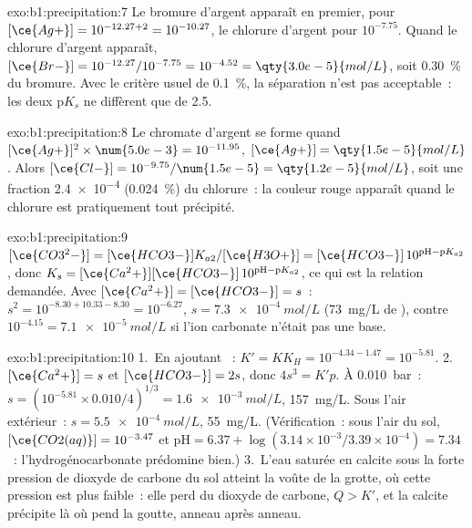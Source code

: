 \begin{solution}{exo:b1:precipitation:7}
Le bromure d'argent apparaît en premier, pour $[\ce{Ag+}] = 10^{-12.27 + 2} =
10^{-10.27}$, le chlorure d'argent pour $10^{-7.75}$. Quand le chlorure
d'argent apparaît, $[\ce{Br-}] = 10^{-12.27}/10^{-7.75} = 10^{-4.52} =
\qty{3.0e-5}{mol/L}$, soit \qty{0.30}{\percent} du bromure. Avec le
critère usuel de \qty{0.1}{\percent}, la séparation n'est pas
acceptable~: les deux
$\mathrm{p}K_s$ ne diffèrent que de 2.5.
\end{solution}

\begin{solution}{exo:b1:precipitation:8}
Le chromate d'argent se forme quand $[\ce{Ag+}]^2 \times \num{5.0e-3} = 10^{-11.95}$,
$[\ce{Ag+}] = \qty{1.5e-5}{mol/L}$. Alors $[\ce{Cl-}] = 10^{-9.75}/\num{1.5e-5}
= \qty{1.2e-5}{mol/L}$, soit une fraction \num{2.4e-4}
(\qty{0.024}{\percent}) du chlorure~: la couleur rouge apparaît quand le
chlorure est pratiquement tout précipité.
\end{solution}

\begin{solution}{exo:b1:precipitation:9}
$[\ce{CO3^2-}] = [\ce{HCO3-}]K_{a2}/[\ce{H3O+}] = [\ce{HCO3-}]\,10^{\mathrm{pH}
- \mathrm{p}K_{a2}}$, donc $K_s = [\ce{Ca^2+}][\ce{HCO3-}]\,10^{\mathrm{pH} -
\mathrm{p}K_{a2}}$, ce qui est la relation demandée. Avec $[\ce{Ca^2+}] =
[\ce{HCO3-}] = s$~: $s^2 = 10^{-8.30 + 10.33 - 8.30} = 10^{-6.27}$,
$s = \qty{7.3e-4}{mol/L}$ (\qty{73}{mg/L} de ), contre
$10^{-4.15} = \qty{7.1e-5}{mol/L}$ si l'ion carbonate n'était pas une
base.
\end{solution}

\begin{solution}{exo:b1:precipitation:10}
1.~En ajoutant ~: $K' = K K_H = 10^{-4.34 - 1.47} =
10^{-5.81}$.
2.~$[\ce{Ca^2+}] = s$ et $[\ce{HCO3-}] = 2s$, donc $4s^3 = K'p$. À
\qty{0.010}{bar}~: $s = (10^{-5.81} \times 0.010/4)^{1/3} =
\qty{1.6e-3}{mol/L}$, \qty{157}{mg/L}. Sous l'air extérieur~:
$s = \qty{5.5e-4}{mol/L}$, \qty{55}{mg/L}. (Vérification~: sous l'air du
sol, $[\ce{CO2(aq)}] = 10^{-3.47}$ et $\mathrm{pH} = 6.37 + \log(3.14\times
10^{-3}/3.39 \times 10^{-4}) = 7.34$~: l'hydrogénocarbonate prédomine
bien.)
3.~L'eau saturée en calcite sous la forte pression de dioxyde de
carbone du sol atteint la voûte de la grotte, où cette pression est plus
faible~: elle perd du dioxyde de carbone, $Q > K'$, et la calcite
précipite là où pend la goutte, anneau après anneau.
\end{solution}

